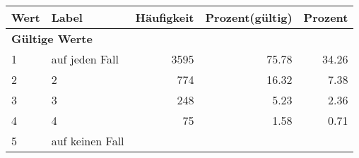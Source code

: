      \begin{longtable}{lXrrr}
     \toprule
     \textbf{Wert} & \textbf{Label} & \textbf{Häufigkeit} & \textbf{Prozent(gültig)} & \textbf{Prozent} \\
     \endhead
     \midrule
     \multicolumn{5}{l}{\textbf{Gültige Werte}}\\

     1 &
     \multicolumn{1}{X}{ auf jeden Fall   } &


       \num{3595} &
       \num[round-mode=places,round-precision=2]{75.78} &
         \num[round-mode=places,round-precision=2]{34.26} \\

     2 &
     \multicolumn{1}{X}{ 2   } &


       \num{774} &
       \num[round-mode=places,round-precision=2]{16.32} &
         \num[round-mode=places,round-precision=2]{7.38} \\

     3 &
     \multicolumn{1}{X}{ 3   } &


       \num{248} &
       \num[round-mode=places,round-precision=2]{5.23} &
         \num[round-mode=places,round-precision=2]{2.36} \\

     4 &
     \multicolumn{1}{X}{ 4   } &


       \num{75} &
       \num[round-mode=places,round-precision=2]{1.58} &
         \num[round-mode=places,round-precision=2]{0.71} \\

     5 &
     \multicolumn{1}{X}{ auf keinen Fall   } &



\end{longtable}
